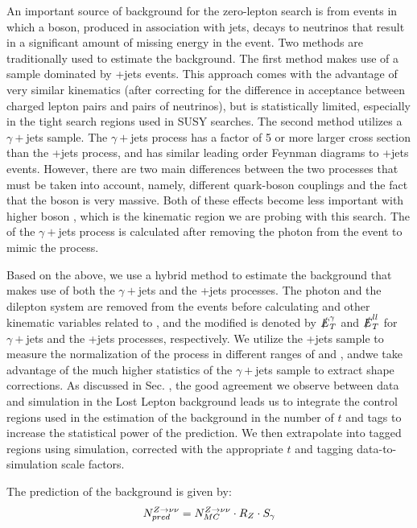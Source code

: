 An important source of background for the zero-lepton search is from events in which a \Z{} boson, produced in association with jets, decays to neutrinos that result in a significant amount of missing energy in the event. Two methods are traditionally used to estimate the \Znunu{} background. The first method makes use of a sample dominated by \Zll+jets events. This approach comes with the advantage of very similar kinematics (after correcting for the difference in acceptance between charged lepton pairs and pairs of neutrinos), but is statistically limited, especially in the tight search regions used in SUSY searches. The second method utilizes a $\gamma+$jets sample. The $\gamma+$jets process has a factor of 5 or more larger cross section than the \Zll+jets process, and has similar leading order Feynman diagrams to \Z+jets events. However, there are two main differences between the two processes that must be taken into account, namely, different quark-boson couplings and the fact that the \Z{} boson is very massive. Both of these effects become less important with higher boson \pt, which is the kinematic region we are probing with this search. The \met{} of the $\gamma+$jets process is calculated after removing the photon from the event to mimic the \Znunu{} process.

Based on the above, we use a hybrid method to estimate the \Znunu{} background that makes use of both the $\gamma+$jets and the \Zll+jets processes. The photon and the dilepton system are removed from the events before calculating \met{} and other kinematic variables related to \met, and the modified \met{} is denoted by $\slashed{E}_{T}^\gamma$ and $\slashed{E}_{T}^{ll}$ for $\gamma+$jets and the \Zll+jets processes, respectively. We utilize the \Zll+jets sample to measure the normalization of the \Znunu{} process in different ranges of \nb{} and \nsv, andwe take advantage of the much higher statistics of the $\gamma+$jets sample to extract shape corrections. As discussed in Sec. , the good agreement we observe between data and simulation in the Lost Lepton background leads us to integrate the control regions used in the estimation of the \Znunu{} background in the number of $t$ and \W{} tags to increase the statistical power of the prediction. We then extrapolate into tagged regions using simulation, corrected with the appropriate $t$ and \W{} tagging data-to-simulation scale factors.

The prediction of the \Znunu{} background is given by:
\begin{equation}
N_{pred}^{Z\rightarrow\nu\nu}=N_{MC}^{Z\rightarrow\nu\nu} \cdot R_Z \cdot S_\gamma
\end{equation}

